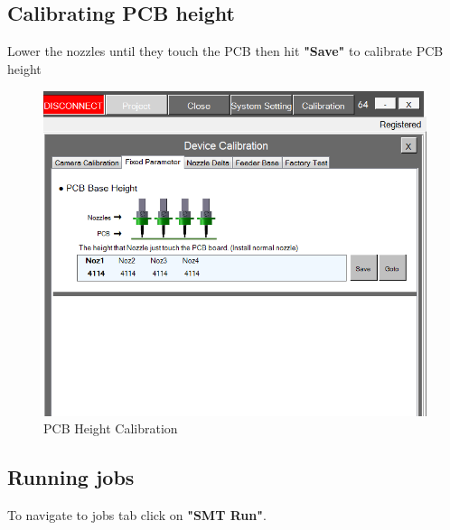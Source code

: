 \documentclass[a4paper,10pt]{report}
\begin{document}
\subsection{Calibrating PCB height}
Lower the nozzles until they touch the PCB then hit \textbf{"Save"} to calibrate PCB height
 \begin{figure}[!htb]
 \centering
 \includegraphics[width=1\textwidth]{scrot41.png}
 \caption{PCB Height Calibration}
\end{figure}
\newpage
\subsection{Running jobs}
To navigate to jobs tab click on \textbf{"SMT Run"}.\\
\end{document}

